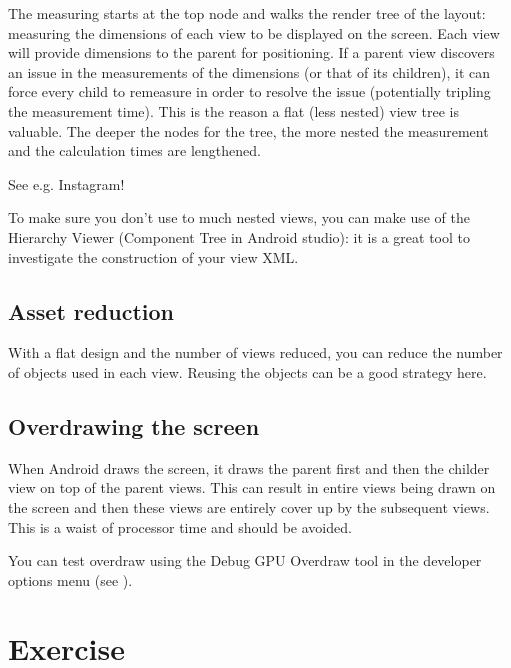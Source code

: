 The measuring starts at the top node and walks the render tree of the layout: measuring the dimensions of each view to be displayed on the screen. Each view will provide dimensions to the parent for positioning. If a parent view discovers an issue in the measurements of the dimensions (or that of its children), it can force every child to remeasure in order to resolve the issue (potentially tripling the measurement time). This is the reason a flat (less nested) view tree is valuable. The deeper the nodes for the tree, the more nested the measurement and the calculation times are lengthened.

See e.g. Instagram! \cite{Kieft2014}


To make sure you don't use to much nested views, you can make use of the Hierarchy Viewer (Component Tree in Android studio): it is a great tool to investigate the construction of your view XML. 

\subsection{Asset reduction}
With a flat design and the number of views reduced, you can reduce the number of objects used in each view. Reusing the objects can be a good strategy here.

\subsection{Overdrawing the screen}
When Android draws the screen, it draws the parent first and then the childer view on top of the parent views. This can result in entire views being drawn on the screen and then these views are entirely cover up by the subsequent views. This is a waist of processor time and should be avoided. 

You can test overdraw using the Debug GPU Overdraw tool in the developer options menu (see \cite{Google2017b}).

 
\newpage
\section{Exercise}

